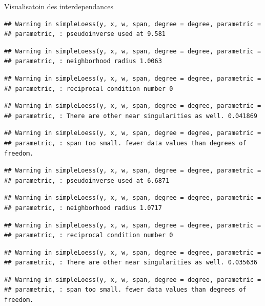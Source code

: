 \documentclass[11pt,ignorenonframetext,]{beamer}
\begin{document}
\begin{frame}[fragile]{Visualisatoin des interdependances}
\begin{verbatim}
## Warning in simpleLoess(y, x, w, span, degree = degree, parametric =
## parametric, : pseudoinverse used at 9.581
\end{verbatim}

\begin{verbatim}
## Warning in simpleLoess(y, x, w, span, degree = degree, parametric =
## parametric, : neighborhood radius 1.0063
\end{verbatim}

\begin{verbatim}
## Warning in simpleLoess(y, x, w, span, degree = degree, parametric =
## parametric, : reciprocal condition number 0
\end{verbatim}

\begin{verbatim}
## Warning in simpleLoess(y, x, w, span, degree = degree, parametric =
## parametric, : There are other near singularities as well. 0.041869
\end{verbatim}

\begin{verbatim}
## Warning in simpleLoess(y, x, w, span, degree = degree, parametric =
## parametric, : span too small. fewer data values than degrees of freedom.
\end{verbatim}

\begin{verbatim}
## Warning in simpleLoess(y, x, w, span, degree = degree, parametric =
## parametric, : pseudoinverse used at 6.6871
\end{verbatim}

\begin{verbatim}
## Warning in simpleLoess(y, x, w, span, degree = degree, parametric =
## parametric, : neighborhood radius 1.0717
\end{verbatim}

\begin{verbatim}
## Warning in simpleLoess(y, x, w, span, degree = degree, parametric =
## parametric, : reciprocal condition number 0
\end{verbatim}

\begin{verbatim}
## Warning in simpleLoess(y, x, w, span, degree = degree, parametric =
## parametric, : There are other near singularities as well. 0.035636
\end{verbatim}

\begin{verbatim}
## Warning in simpleLoess(y, x, w, span, degree = degree, parametric =
## parametric, : span too small. fewer data values than degrees of freedom.
\end{verbatim}


\end{frame}
\end{document}
